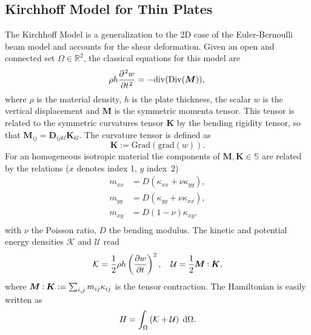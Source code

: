 \documentclass[letterpaper, 10 pt, conference]{ieeeconf}
\def\onedot{$\mathsurround0pt\ldotp$}
\def\cddot{%
	\mathbin{\vcenter{\baselineskip.67ex
			\hbox{\onedot}\hbox{\onedot}}%
}}
\begin{document}
\subsection{Kirchhoff Model for Thin Plates}
\label{subsec:classMin}
The Kirchhoff Model is a generalization to the 2D case of the Euler-Bernoulli beam model and accounts for the shear deformation. Given an open and connected set $\Omega \in \mathbb{R}^2$, the classical equations for this model \cite{timoshenko1959theory} are 
\begin{equation}
\displaystyle \rho h \diffp[2]{w}{t} = -\mathrm{div}(\mathrm{Div}(\bm{M})), \\
\end{equation}
where $\rho$ is the material density, $h$ is the plate thickness, the scalar $w$ is the vertical displacement and $\bm{M}$ is the symmetric momenta tensor.  This tensor is related to the symmetric curvatures tensor $\bm{K}$ by the bending rigidity tensor, so that $\bm{M}_{ij} = \bm{D}_{ijkl} \bm{K}_{kl}$. The curvature tensor is defined as
\begin{equation*}
\bm{K} := \mathrm{Grad}(\mathrm{grad}(w)).
\end{equation*}
For an homogeneous isotropic material the components of $\bm{M}, \bm{K} \in \mathbb{S}$ are related by the relations ($x$ denotes index 1, $y$ index~2)
\begin{equation*}
\begin{aligned}
m_{xx} &= D\left(\kappa_{xx} + \nu \kappa_{yy}\right),\\
m_{yy} &= D\left(\kappa_{yy} + \nu \kappa_{xx}\right),\\
m_{xy} &= D(1 - \nu) \kappa_{xy}, \\
\end{aligned}
\end{equation*}
with $\nu$ the Poisson ratio, $D$ the bending modulus. The kinetic and potential energy densities $\mathcal{K}$ and $\mathcal{U}$ read
\begin{equation}
\mathcal{K} =  \frac{1}{2}\rho h \left(\diffp{w}{t} \right)^2, \quad
\mathcal{U} = \frac{1}{2} \bm{M} \cddot \bm{K},
\end{equation} 
where $\bm{M} \cddot \bm{K} := \sum_{i,j} m_{ij} \kappa_{ij}$ is the tensor contraction. The Hamiltonian  is easily written as
\begin{equation} 
H = \int_{\Omega} \left( \mathcal{K} + \mathcal{U} \right)   \d\Omega. 
\end{equation}
\end{document}
